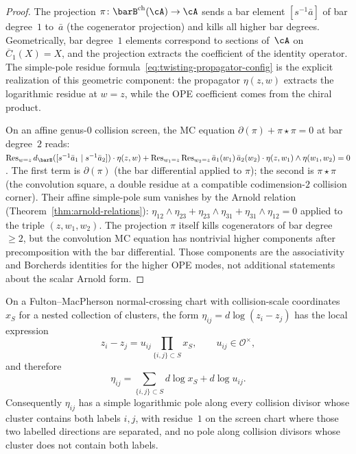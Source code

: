 \begin{proof}
The projection $\pi\colon \barB^{\mathrm{ch}}(\cA) \to \cA$ sends
a bar element $[s^{-1}\bar{a}]$ of bar degree~$1$ to~$\bar{a}$
(the cogenerator projection) and kills all higher bar degrees.
Geometrically, bar degree~$1$ elements correspond to sections
of~$\cA$ on $\overline{C}_1(X) = X$, and the projection extracts
the coefficient of the identity operator. The simple-pole residue
formula~\eqref{eq:twisting-propagator-config} is the explicit
realization of this geometric component: the propagator $\eta(z,w)$
extracts the logarithmic residue at $w = z$, while the OPE coefficient
comes from the chiral product.

On an affine genus-$0$ collision screen, the MC equation
$\partial(\pi) + \pi \star \pi = 0$ at bar degree~$2$ reads:
$\operatorname{Res}_{w=z} d_{\barB}([s^{-1}\bar{a}_1 \mid
s^{-1}\bar{a}_2]) \cdot \eta(z,w)
+ \operatorname{Res}_{w_1=z} \operatorname{Res}_{w_2=z}
\bar{a}_1(w_1)\,\bar{a}_2(w_2) \cdot
\eta(z,w_1) \wedge \eta(w_1,w_2) = 0$.
The first term is $\partial(\pi)$ (the bar differential applied to
$\pi$); the second is $\pi \star \pi$ (the convolution square,
a double residue at a compatible codimension-$2$ collision corner).
Their affine simple-pole sum vanishes by the Arnold relation
(Theorem~\ref{thm:arnold-relations}):
$\eta_{12} \wedge \eta_{23} + \eta_{23} \wedge \eta_{31}
+ \eta_{31} \wedge \eta_{12} = 0$ applied to the triple
$(z, w_1, w_2)$.
The projection $\pi$ itself kills cogenerators of bar degree~$\geq2$,
but the convolution MC equation has nontrivial higher components after
precomposition with the bar differential. Those components are the
associativity and Borcherds identities for the higher OPE modes, not
additional statements about the scalar Arnold form.
\end{proof}

\begin{lemma}\label{lem:basic-log-form-residue}
On a Fulton--MacPherson normal-crossing chart with collision-scale
coordinates $x_S$ for a nested collection of clusters, the form
$\eta_{ij}=d\log(z_i-z_j)$ has the local expression
\[
z_i-z_j
=
u_{ij}\prod_{\{i,j\}\subset S}x_S,
\qquad
u_{ij}\in\mathcal O^\times,
\]
and therefore
\[
\eta_{ij}
=
\sum_{\{i,j\}\subset S}d\log x_S+d\log u_{ij}.
\]
Consequently $\eta_{ij}$ has a simple logarithmic pole along every
collision divisor whose cluster contains both labels $i,j$, with
residue~$1$ on the screen chart where those two labelled directions are
separated, and no pole along collision divisors whose cluster does not
contain both labels.
\end{lemma}


